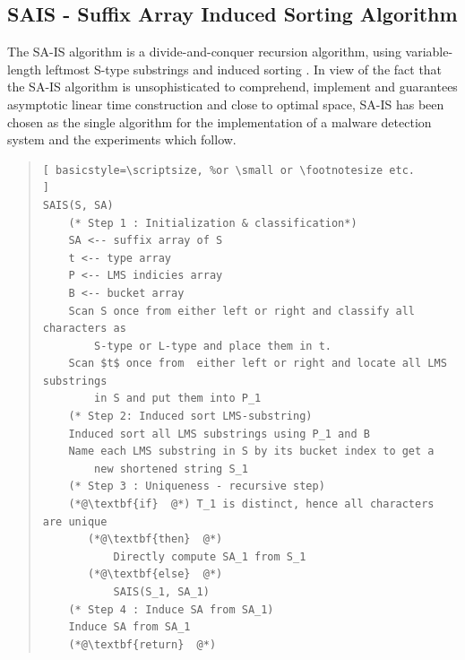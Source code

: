 \documentclass[12pt]{article} %
\begin{document}
\subsection{SAIS - Suffix Array Induced Sorting Algorithm} \label{SAIS Section}

The SA-IS algorithm is a divide-and-conquer recursion algorithm, using variable-length leftmost S-type substrings and induced sorting \cite{twoeffecient}. In view of the fact that the SA-IS algorithm is unsophisticated to comprehend, implement and guarantees asymptotic linear time construction and close to optimal space,  SA-IS has been chosen as the single algorithm for the implementation of a malware detection system and the experiments which follow. 

\begin{quote}
\begin{lstlisting}[ basicstyle=\scriptsize, %or \small or \footnotesize etc.
]
SAIS(S, SA)
    (* Step 1 : Initialization & classification*)
    SA <-- suffix array of S
    t <-- type array
    P <-- LMS indicies array
    B <-- bucket array
    Scan S once from either left or right and classify all characters as 
        S-type or L-type and place them in t.
    Scan $t$ once from  either left or right and locate all LMS substrings 
        in S and put them into P_1
    (* Step 2: Induced sort LMS-substring)
    Induced sort all LMS substrings using P_1 and B
    Name each LMS substring in S by its bucket index to get a 
        new shortened string S_1
    (* Step 3 : Uniqueness - recursive step)
    (*@\textbf{if}  @*) T_1 is distinct, hence all characters are unique
       (*@\textbf{then}  @*) 
           Directly compute SA_1 from S_1
       (*@\textbf{else}  @*) 
           SAIS(S_1, SA_1)
    (* Step 4 : Induce SA from SA_1)
    Induce SA from SA_1       
    (*@\textbf{return}  @*) 
\end{lstlisting}
\end{quote}
\end{document}
